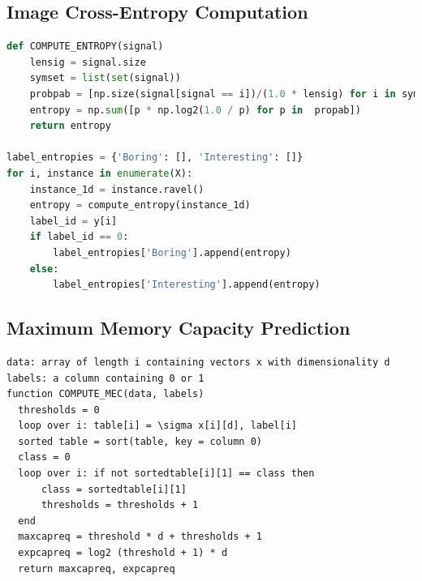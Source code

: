\documentclass[12pt]{article}
\numberwithin{figure}{section} %
\begin{document}
\subsection{Image Cross-Entropy Computation}
\begin{lstlisting}[language = Python]
def COMPUTE_ENTROPY(signal)
    lensig = signal.size
    symset = list(set(signal))
    probpab = [np.size(signal[signal == i])/(1.0 * lensig) for i in symset]
    entropy = np.sum([p * np.log2(1.0 / p) for p in  propab])
    return entropy

label_entropies = {'Boring': [], 'Interesting': []}
for i, instance in enumerate(X):
    instance_1d = instance.ravel()
    entropy = compute_entropy(instance_1d)
    label_id = y[i]
    if label_id == 0:
        label_entropies['Boring'].append(entropy)
    else:
        label_entropies['Interesting'].append(entropy)
\end{lstlisting}

\subsection{Maximum Memory Capacity Prediction}
\begin{lstlisting}
data: array of length i containing vectors x with dimensionality d 
labels: a column containing 0 or 1
function COMPUTE_MEC(data, labels)
  thresholds = 0
  loop over i: table[i] = \sigma x[i][d], label[i]
  sorted table = sort(table, key = column 0) 
  class = 0
  loop over i: if not sortedtable[i][1] == class then 
      class = sortedtable[i][1]
      thresholds = thresholds + 1
  end
  maxcapreq = threshold * d + thresholds + 1
  expcapreq = log2 (threshold + 1) * d
  return maxcapreq, expcapreq
\end{lstlisting}
\end{document}
